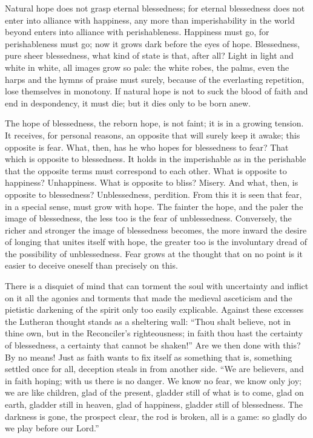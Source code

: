 \documentclass[12pt,a4paper,openany]{book}
\newcommand{\opage}[1]{\marginnote{\footnotesize\textit{[#1]}}}
\begin{document}
Natural hope does not grasp eternal blessedness; for eternal blessedness does not enter into alliance with happiness,
any more than imperishability in the world beyond enters into alliance with perishableness. Happiness must go, for
perishableness must go; now it grows dark before the eyes of hope. Blessedness, pure
\setcounter{footnote}{0}%
\opage{100}sheer blessedness, what kind of state is that, after all? Light in light and white in white, all images
grow so pale: the white robes, the palms, even the harps and the hymns of praise must surely, because of the
everlasting repetition, lose themselves in monotony. If natural hope is not to suck the blood of faith and end in
despondency, it must die; but it dies only to be born anew.

The hope of blessedness, the reborn hope, is not faint; it is in a growing tension. It receives, for personal
reasons, an opposite that will surely keep it awake; this opposite is fear. What, then, has he who hopes for
blessedness to fear? That which is opposite to blessedness. It holds in the imperishable as in the perishable that the
opposite terms must correspond to each other. What is opposite to happiness? Unhappiness. What is opposite to bliss?
Misery. And what, then, is opposite to blessedness? Unblessedness, perdition. From this it is seen that fear, in a
special sense, must grow with hope. The fainter the hope, and the paler the image of blessedness, the less too is the
fear of unblessedness. Conversely, the richer and stronger the image of blessedness becomes, the more inward the desire
of longing that unites itself with hope, the greater too is the involuntary dread of the possibility of
unblessedness. Fear grows at the thought that on no point is it easier to deceive oneself than precisely on this.

There is a disquiet of mind that can torment the soul with uncertainty and inflict on it all the agonies and torments
that made the medieval asceticism and the pietistic darkening of the spirit only too easily explicable. Against these
excesses the Lutheran thought stands as a sheltering wall: ``Thou shalt believe, not in thine own, but
\setcounter{footnote}{0}%
\opage{101}in the Reconciler's righteousness; in faith thou hast the certainty of blessedness, a certainty that cannot
be shaken!'' Are we then done with this? By no means! Just as faith wants to fix itself as something that is,
something settled once for all, deception steals in from another side. ``We are believers, and in faith hoping; with
us there is no danger. We know no fear, we know only joy; we are like children, glad of the present, gladder still of
what is to come, glad on earth, gladder still in heaven, glad of happiness, gladder still of blessedness. The darkness
is gone, the prospect clear, the rod is broken, all is a game: so gladly do we play before our Lord.''
\end{document}
